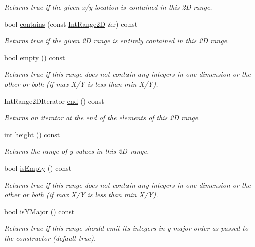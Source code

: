 \begin{DoxyCompactItemize}
\begin{DoxyCompactList}\small\item\em Returns true if the given x/y location is contained in this 2D range. \end{DoxyCompactList}\item 
bool \mbox{\hyperlink{classIntRange2D_a3c4705ae7b99ee1d5cd6326e5f2869bf}{contains}} (const \mbox{\hyperlink{classIntRange2D}{Int\+Range2D}} \&r) const
\begin{DoxyCompactList}\small\item\em Returns true if the given 2D range is entirely contained in this 2D range. \end{DoxyCompactList}\item 
bool \mbox{\hyperlink{classIntRange2D_a644718bb2fb240de962dc3c9a1fdf0dc}{empty}} () const
\begin{DoxyCompactList}\small\item\em Returns true if this range does not contain any integers in one dimension or the other or both (if max X/Y is less than min X/Y). \end{DoxyCompactList}\item 
Int\+Range2\+D\+Iterator \mbox{\hyperlink{classIntRange2D_aa7bf3d68f7aec8215aa12584f8c47443}{end}} () const
\begin{DoxyCompactList}\small\item\em Returns an iterator at the end of the elements of this 2D range. \end{DoxyCompactList}\item 
int \mbox{\hyperlink{classIntRange2D_ad3774f6419003470f54fd495124ef51f}{height}} () const
\begin{DoxyCompactList}\small\item\em Returns the range of y-\/values in this 2D range. \end{DoxyCompactList}\item 
bool \mbox{\hyperlink{classIntRange2D_acf82f9b2937375c7b1cf3dccb3df3312}{is\+Empty}} () const
\begin{DoxyCompactList}\small\item\em Returns true if this range does not contain any integers in one dimension or the other or both (if max X/Y is less than min X/Y). \end{DoxyCompactList}\item 
bool \mbox{\hyperlink{classIntRange2D_a7387191f7e5206084124db7bc29d1891}{is\+Y\+Major}} () const
\begin{DoxyCompactList}\small\item\em Returns true if this range should emit its integers in y-\/major order as passed to the constructor (default true). \end{DoxyCompactList}\item 

\end{DoxyCompactItemize}
